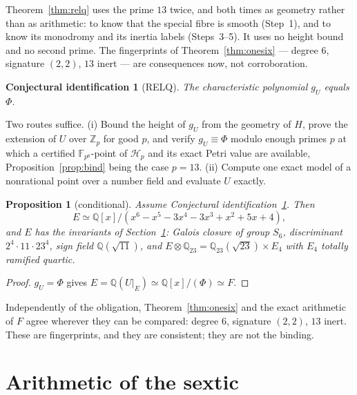 \documentclass[11pt]{amsart}
\newcommand{\QQ}{\mathbb{Q}}
\newcommand{\ZZ}{\mathbb{Z}}
\newcommand{\FF}{\mathbb{F}}
\newcommand{\Hs}{\mathscr H}
\newcommand{\gU}{g_U}
\newcommand{\sextic}{x^6-x^5-3x^4-3x^3+x^2+5x+4}
\theoremstyle{plain}
\newtheorem{proposition}[theorem]{Proposition}
\newtheorem{conjecture}[theorem]{Conjectural identification}
\theoremstyle{definition}
\begin{document}
Theorem~\ref{thm:relq} uses the prime $13$ twice, and both times as
geometry rather than as arithmetic: to know that the special fibre is
smooth (Step~1), and to know its monodromy and its inertia labels
(Steps~3--5). It uses no height bound and no second prime. The
fingerprints of Theorem~\ref{thm:onesix} --- degree $6$, signature
$(2,2)$, $13$ inert --- are consequences now, not corroboration.

\else
\begin{conjecture}[RELQ]\label{conj:relq}
The characteristic polynomial $\gU$ equals $\Phi$.
\end{conjecture}

Two routes suffice. (i) Bound the height of $\gU$ from the geometry of
$H$, prove the extension of $U$ over $\ZZ_p$ for good $p$, and verify
$\gU\equiv\Phi$ modulo enough primes $p$ at which a certified
$\FF_{p^6}$-point of $\Hs_p$ and its exact Petri value are available,
Proposition~\ref{prop:bind} being the case $p=13$. (ii) Compute one
exact model of a nonrational point over a number field and evaluate
$U$ exactly.

\begin{proposition}[conditional]\label{prop:sextic}
Assume Conjectural identification~\ref{conj:relq}. Then
\[
  E\simeq\QQ[x]/(\sextic),
\]
and $E$ has the invariants of Section~\ref{sec:sexticarith}: Galois
closure of group $S_6$, discriminant $2^4\cdot11\cdot23^4$, sign field
$\QQ(\sqrt{11})$, and $E\otimes\QQ_{23}=\QQ_{23}(\sqrt{23})\times E_4$
with $E_4$ totally ramified quartic.
\end{proposition}
\begin{proof}
$\gU=\Phi$ gives $E=\QQ(U|_E)\simeq\QQ[x]/(\Phi)\simeq F$.
\end{proof}

Independently of the obligation, Theorem~\ref{thm:onesix} and the
exact arithmetic of $F$ agree wherever they can be compared: degree
$6$, signature $(2,2)$, $13$ inert. These are fingerprints, and they
are consistent; they are not the binding.
\fi

\section{Arithmetic of the sextic}\label{sec:sexticarith}
\end{document}
